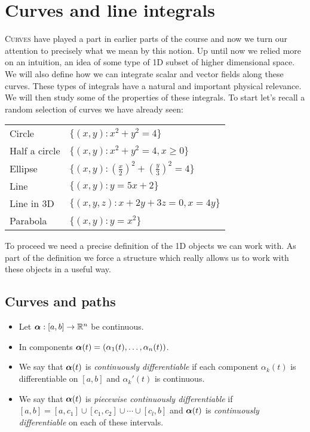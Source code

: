 \chapter{Curves and line integrals}

\lettrine{C}{urves} have played a part in earlier parts of the course and now we turn our attention to precisely what we mean by this notion.
Up until now we relied more on an intuition, an idea of some type of 1D subset of higher dimensional space.
We will also define how we can integrate scalar and vector fields along these curves.
These types of integrals have a natural and important physical relevance.
We will then study some of the properties of these integrals.
To start let's recall a random selection of curves we have already seen:

\begin{tabular}{l l}
    Circle        & \(\{(x,y):x^2+y^2 = 4\}\)                            \\
    Half a circle & \(\{(x,y): x^2+y^2 = 4, x\geq 0\}\)                  \\
    Ellipse       & \(\{(x,y): (\frac{x}{2})^2 + (\frac{y}{3})^2 = 4\}\) \\
    Line          & \(\{(x,y):y=5x+2\}\)                                 \\
    Line in 3D    & \(\{(x,y,z):x+2y+3z=0, x=4y\}\)                      \\
    Parabola      & \(\{(x,y):y=x^2\}\)
\end{tabular}

\noindent
To proceed we need a precise definition of the 1D objects we can work with.
As part of the definition we force a structure which really allows us to work with these objects in a useful way.

\section{Curves and paths}

\begin{itemize}
    \item Let \(\boldsymbol{\alpha} : [a,b] \to \mathbb{R}^n\) be continuous.
    \item  In components \(\boldsymbol{\alpha}(t) = (\alpha_1(t),\ldots,\alpha_n(t))\).
    \item  We say that \(\boldsymbol{\alpha}(t)\) is \emph{continuously differentiable} if each component \(\alpha_k(t)\) is differentiable on \([a,b]\) and \(\alpha_k'(t)\) is continuous.
    \item We say that \(\boldsymbol{\alpha}(t)\) is \emph{piecewise continuously differentiable} if \([a,b] = [a,c_1]\cup[c_1,c_2] \cup \cdots \cup [c_l,b]\) and \(\boldsymbol{\alpha}(t)\) is \emph{continuously differentiable} on each of these intervals.
\end{itemize}



